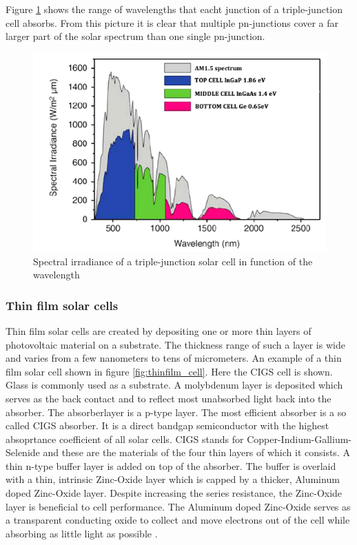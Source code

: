 Figure \ref{multi_irradiance} \cite{yastrebova} shows the range of wavelengths that eacht junction of a triple-junction cell absorbs. From this picture it is clear that multiple pn-junctions cover a far larger part of the solar spectrum than one single pn-junction.

\begin{figure}[H]
\centering
\includegraphics{chapters/img/multijunction_spectral_irradiance.png}
\caption{Spectral irradiance of a triple-junction solar cell in function of the wavelength}
\label{multi_irradiance}
\end{figure}

\subsubsection{Thin film solar cells}
Thin film solar cells are created by depositing one or more thin layers of photovoltaic material on a substrate. The thickness range of such a layer is wide and varies from a few nanometers to tens of micrometers. An example of a thin film solar cell shown in figure 
\ref{fig:thinfilm_cell}. Here the CIGS cell is shown. Glass is commonly used as a substrate. A molybdenum layer is deposited which serves as the back contact and to reflect most unabsorbed light back into the absorber. The absorberlayer is a p-type layer. The most efficient absorber is a so called CIGS absorber. It is a direct bandgap semiconductor with the highest absoprtance coefficient of all solar cells. CIGS stands for Copper-Indium-Gallium-Selenide and these are the materials of the four thin layers of which it consists. A thin n-type buffer layer is added on top of the absorber. The buffer is overlaid with a thin, intrinsic Zinc-Oxide layer which is capped by a thicker, Aluminum doped Zinc-Oxide layer. Despite increasing the series resistance, the Zinc-Oxide layer is beneficial to cell performance. The Aluminum doped Zinc-Oxide serves as a transparent conducting oxide to collect and move electrons out of the cell while absorbing as little light as possible \cite{dhere}.

